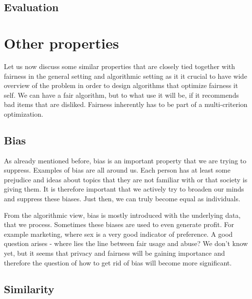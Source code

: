 \begin{itemize}
    \subsection{Evaluation} \label{sec:02_evaluation}
    
\end{itemize}

\section{Other properties} \label{sec:02_other_properties}
Let us now discuss some similar properties that are closely tied together with fairness in the general setting and algorithmic setting as it it crucial to have wide overview of the problem in order to design algorithms that optimize fairness it self. We can have a fair algorithm, but to what use it will be, if it recommends bad items that are disliked. Fairness inherently has to be part of a multi-criterion optimization.

\subsection{Bias}
As already mentioned before, bias is an important property that we are trying to suppress. Examples of bias are all around us. Each person has at least some prejudice and ideas about topics that they are not familiar with or that society is giving them. It is therefore important that we actively try to broaden our minds and suppress these biases. Just then, we can truly become equal as individuals.

From the algorithmic view, bias is mostly introduced with the underlying data, that we process. Sometimes these biases are used to even generate profit. For example marketing, where sex is a very good indicator of preference. A good question arises - where lies the line between fair usage and abuse? We don't know yet, but it seems that privacy and fairness will be gaining importance and therefore the question of how to get rid of bias will become more significant.


\subsection{Similarity}


